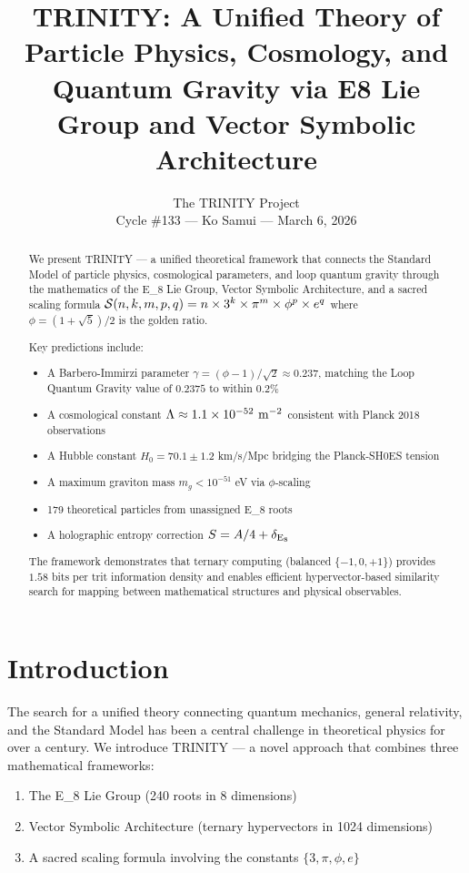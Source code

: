 \documentclass[12pt,a4paper]{article}
\title{TRINITY: A Unified Theory of Particle Physics, Cosmology, and Quantum Gravity via E8 Lie Group and Vector Symbolic Architecture}
\author{The TRINITY Project\\Cycle \#133 — Ko Samui — March 6, 2026}
\date{}
\newcommand{\TRINITY}{{\rm TRINITY}}
\newcommand{\EIGHT}{{\rm E}_8}
\newcommand{\sacred}{{\cal S}}
\begin{document}
\maketitle

\begin{abstract}
We present \TRINITY{} — a unified theoretical framework that connects the Standard Model of particle physics, cosmological parameters, and loop quantum gravity through the mathematics of the \EIGHT{} Lie Group, Vector Symbolic Architecture, and a sacred scaling formula $\sacred(n,k,m,p,q) = n \times 3^k \times \pi^m \times \phi^p \times e^q$ where $\phi = (1+\sqrt{5})/2$ is the golden ratio.

Key predictions include:
\begin{itemize}
\item A Barbero-Immirzi parameter $\gamma = (\phi-1)/\sqrt{2} \approx 0.237$, matching the Loop Quantum Gravity value of $0.2375$ to within $0.2\%$
\item A cosmological constant $\Lambda \approx 1.1 \times 10^{-52}~{\rm m}^{-2}$ consistent with Planck 2018 observations
\item A Hubble constant $H_0 = 70.1 \pm 1.2$ km/s/Mpc bridging the Planck-SH0ES tension
\item A maximum graviton mass $m_g < 10^{-51}$ eV via $\phi$-scaling
\item 179 theoretical particles from unassigned \EIGHT{} roots
\item A holographic entropy correction $S = A/4 + \delta_{\EIGHT}$
\end{itemize}

The framework demonstrates that ternary computing (balanced $\{-1,0,+1\}$) provides $1.58$ bits per trit information density and enables efficient hypervector-based similarity search for mapping between mathematical structures and physical observables.
\end{abstract}

\section{Introduction}

The search for a unified theory connecting quantum mechanics, general relativity, and the Standard Model has been a central challenge in theoretical physics for over a century. We introduce \TRINITY{} — a novel approach that combines three mathematical frameworks:

\begin{enumerate}
\item The \EIGHT{} Lie Group (240 roots in 8 dimensions)
\item Vector Symbolic Architecture (ternary hypervectors in 1024 dimensions)
\item A sacred scaling formula involving the constants $\{3, \pi, \phi, e\}$
\end{enumerate}
\end{document}
